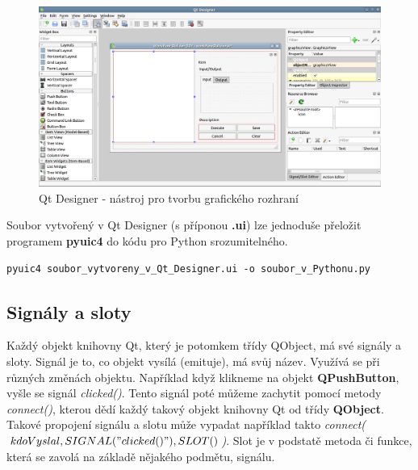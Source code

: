 \begin{figure}[h]
	\centering
	\includegraphics[scale=0.35]{pictures/qt/qt_designer}
	\caption{Qt Designer - nástroj pro tvorbu grafického rozhraní}
  	\label{qtdesigner}
\end{figure}

Soubor vytvořený v Qt Designer (s příponou \textbf{.ui}) lze jednoduše přeložit programem \textbf{pyuic4} do kódu pro Python srozumitelného. \\

\begin{lstlisting}[label=pyuic4,caption={pyuic4 - přeložení .ui souboru do pythoního kódu}]
		pyuic4 soubor_vytvoreny_v_Qt_Designer.ui -o soubor_v_Pythonu.py 
\end{lstlisting}

\newpage
\subsection{Signály a sloty}
Každý objekt knihovny Qt, který je potomkem třídy QObject, má své signály a sloty. Signál je to, co objekt vysílá (emituje), má svůj název. Využívá se při různých změnách objektu. Například když klikneme na objekt \textbf{QPushButton}, vyšle se signál \textit{clicked()}. Tento signál poté můžeme zachytit pomocí metody \textit{connect()}, kterou dědí každý takový objekt knihovny Qt od třídy \textbf{QObject}. Takové propojení signálu a slotu může vypadat například takto \textit{connect($kdoVyslal,SIGNAL("clicked()"), SLOT()$)}. Slot je v podstatě metoda či funkce, která se zavolá na základě nějakého podmětu, signálu. 

